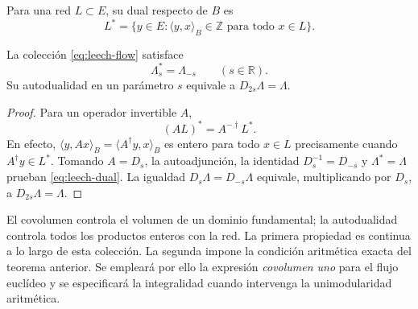\begin{definition}
Para una red \(L\subset E\), su dual respecto de \(B\) es
\[
 L^*=\{y\in E:\langle y,x\rangle_B\in\mathbb Z
                         \text{ para todo }x\in L\}.
\]
\end{definition}

\begin{theorem}
\label{thm:leech-dual}
La colección \eqref{eq:leech-flow} satisface
\begin{equation}
 \Lambda_s^*=\Lambda_{-s}\qquad(s\in\mathbb R).
 \label{eq:leech-dual}
\end{equation}
Su autodualidad en un parámetro \(s\) equivale a
\(D_{2s}\Lambda=\Lambda\).
\end{theorem}
\begin{proof}
Para un operador invertible \(A\),
\[
 (AL)^*=A^{-\dagger}L^*.
\]
En efecto, \(\langle y,Ax\rangle_B=\langle A^\dagger y,x\rangle_B\)
es entero para todo \(x\in L\) precisamente cuando
\(A^\dagger y\in L^*\). Tomando \(A=D_s\), la autoadjunción,
la identidad \(D_s^{-1}=D_{-s}\) y \(\Lambda^*=\Lambda\) prueban
\eqref{eq:leech-dual}. La igualdad
\(D_s\Lambda=D_{-s}\Lambda\) equivale, multiplicando por \(D_s\),
a \(D_{2s}\Lambda=\Lambda\).
\end{proof}

El covolumen controla el volumen de un dominio fundamental; la
autodualidad controla todos los productos enteros con la red.
La primera propiedad es continua a lo largo de esta colección. La
segunda impone la condición aritmética exacta del teorema anterior.
Se empleará por ello la expresión \emph{covolumen uno} para el
flujo euclídeo y se especificará la integralidad cuando intervenga
la unimodularidad aritmética.

